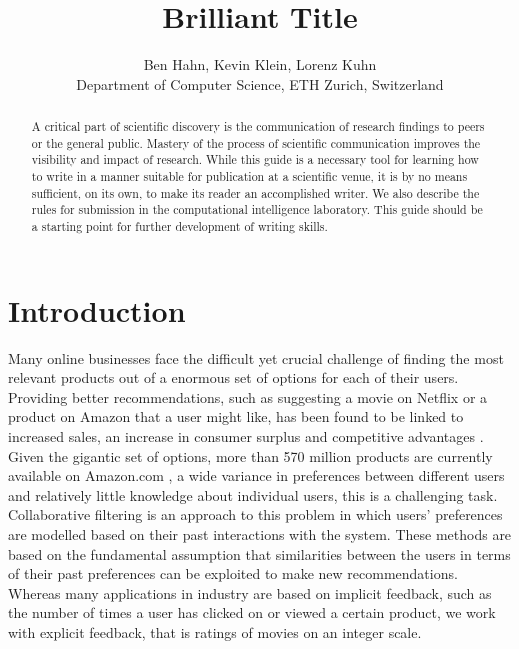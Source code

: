 \documentclass[10pt,conference,compsocconf]{IEEEtran}
\begin{document}
\title{Brilliant Title}

\author{
  Ben Hahn, Kevin Klein, Lorenz Kuhn\\
  Department of Computer Science, ETH Zurich, Switzerland
}

\maketitle

\begin{abstract}
  A critical part of scientific discovery is the
  communication of research findings to peers or the general public.
  Mastery of the process of scientific communication improves the
  visibility and impact of research. While this guide is a necessary
  tool for learning how to write in a manner suitable for publication
  at a scientific venue, it is by no means sufficient, on its own, to
  make its reader an accomplished writer. We also describe the rules
  for submission in the computational intelligence laboratory.
  This guide should be a
  starting point for further development of writing skills.
\end{abstract}

\section{Introduction}


Many online businesses face the difficult yet crucial challenge of finding the most relevant products out of a enormous set of options for each of their users. Providing better recommendations, such as suggesting a movie on Netflix or a product on Amazon that a user might like, has been found to be linked to increased sales, an increase in consumer surplus and competitive advantages \cite{hinz2010impact}.
Given the gigantic set of options, more than 570 million products are currently available on Amazon.com \cite{scrap2018}, a wide variance in preferences between different users and relatively little knowledge about individual users, this is a challenging task. Collaborative filtering \cite{sarwar2001item} is an approach to this problem in which users' preferences are modelled based on their past interactions with the system. These methods are based on the fundamental assumption that similarities between the users in terms of their past preferences can be exploited to make new recommendations. Whereas many applications in industry are based on implicit feedback, such as the number of times a user has clicked on or viewed a certain product, we work with explicit feedback, that is ratings of movies on an integer scale. 
\end{document}
